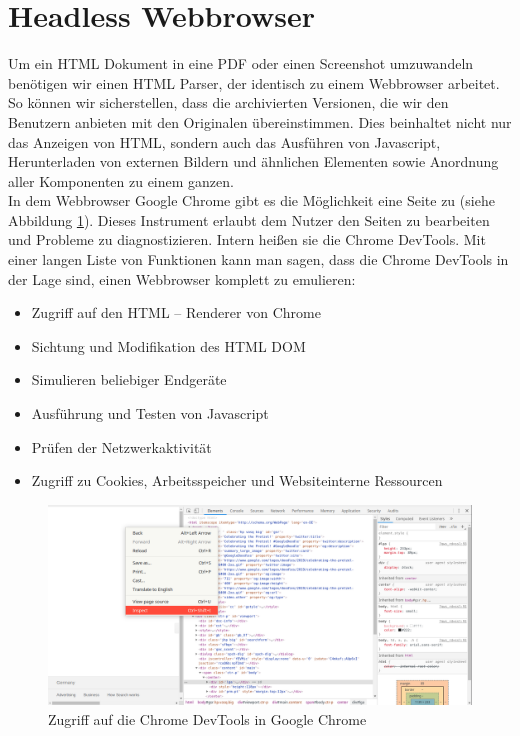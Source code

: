 \section{Headless Webbrowser} \label{scraper:sec:headless}
Um ein HTML Dokument in eine PDF oder einen Screenshot umzuwandeln benötigen wir einen HTML Parser, der identisch zu einem Webbrowser arbeitet. So können wir sicherstellen, dass die archivierten Versionen, die wir den Benutzern anbieten mit den Originalen übereinstimmen. Dies beinhaltet nicht nur das Anzeigen von HTML, sondern auch das Ausführen von Javascript, Herunterladen von externen Bildern und ähnlichen Elementen sowie Anordnung aller Komponenten zu einem ganzen. \\
In dem Webbrowser Google Chrome gibt es die Möglichkeit eine Seite zu  (siehe Abbildung \ref{scraper:image:cdpinspect}). Dieses Instrument erlaubt dem Nutzer den Seiten zu bearbeiten und Probleme zu diagnostizieren. Intern heißen sie die Chrome DevTools. Mit einer langen Liste von Funktionen kann man sagen, dass die Chrome DevTools in der Lage sind, einen Webbrowser komplett zu emulieren:
\begin{itemize}
	\item Zugriff auf den HTML – Renderer von Chrome
	\item Sichtung und Modifikation des \ac{HTML DOM}
	\item Simulieren beliebiger Endgeräte
	\item Ausführung und Testen von Javascript
	\item Prüfen der Netzwerkaktivität
	\item Zugriff zu Cookies, Arbeitsspeicher und Websiteinterne Ressourcen
\end{itemize}


\begin{figure}[h]
	\centering
	\includegraphics[width=\linewidth]{images/cdp_inspect.png}
	\caption{Zugriff auf die Chrome DevTools in Google Chrome}
	\label{scraper:image:cdpinspect}
\end{figure}

